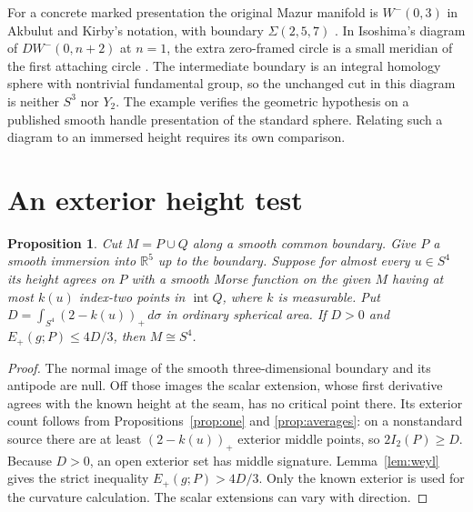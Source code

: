 \documentclass[11pt,letterpaper]{article}
\numberwithin{equation}{section}
\newtheorem{proposition}[theorem]{Proposition}
\begin{document}
For a concrete marked presentation the original Mazur manifold is
\(W^-(0,3)\) in Akbulut and Kirby's notation, with boundary
\(\Sigma(2,5,7)\) \cite[\S1, Proposition 1 and Theorem 2]{AkbulutKirby1979Mazur}.
In Isoshima's diagram of \(DW^-(0,n+2)\) at \(n=1\), the extra
zero-framed circle is a small meridian of the first attaching
circle \cite[Figure 37]{Isoshima2025MazurDoubles}. The intermediate
boundary is an integral homology sphere with nontrivial fundamental
group, so the unchanged cut in this diagram is neither \(S^3\) nor
\(Y_2\). The example verifies the geometric hypothesis on a published
smooth handle presentation of the standard sphere. Relating such a
diagram to an immersed height requires its own comparison.

\section{An exterior height test}\label{sec:exterior}

\begin{proposition}\label{prop:exterior}
Cut \(M=P\cup Q\) along a smooth common boundary. Give \(P\) a
smooth immersion into \(\mathbb R^5\) up to the boundary.
Suppose for almost every \(u\in S^4\) its height agrees on \(P\)
with a smooth Morse function on the given \(M\) having at most
\(k(u)\) index-two points in \(\operatorname{int}Q\), where \(k\)
is measurable. Put \(D=\int_{S^4}(2-k(u))_+\,d\sigma\) in ordinary
spherical area. If \(D>0\) and \(E_+(g;P)\le4D/3\), then
\(M\cong S^4\).
\end{proposition}

\begin{proof}
The normal image of the smooth three-dimensional boundary and its
antipode are null. Off those images the scalar extension, whose
first derivative agrees with the known height at the seam, has
no critical point there. Its exterior count follows from
Propositions~\ref{prop:one} and \ref{prop:averages}: on a nonstandard
source there are at least \((2-k(u))_+\) exterior middle points,
so \(2I_2(P)\ge D\). Because \(D>0\), an open exterior set has
middle signature. Lemma~\ref{lem:weyl} gives the strict inequality
\(E_+(g;P)>4D/3\). Only the known exterior is used for the curvature
calculation. The scalar extensions can vary with direction.
\end{proof}
\end{document}
